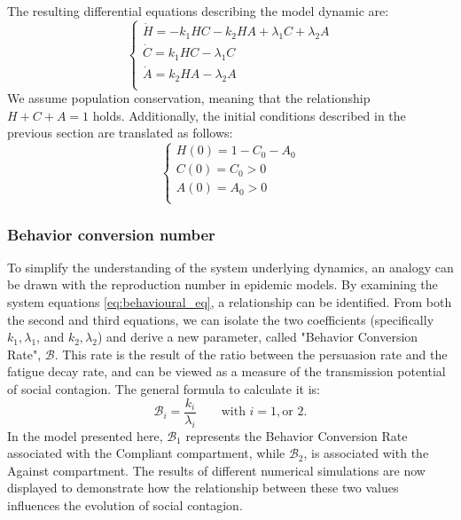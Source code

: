 The resulting differential equations describing the model dynamic are:
\begin{equation}
	\label{eq:behavioural_eq}
	\begin{cases}
		\dot{H} = -k_1 H C - k_2 H A + \lambda_1 C + \lambda_2 A \\
		\dot{C} = k_1 H C -  \lambda_1 C \\
		\dot{A} = k_2 H A -  \lambda_2 A\\
	\end{cases}
\end{equation}
We assume population conservation, meaning that the relationship $H + C + A = 1$ holds. Additionally, the initial conditions described in the previous section are translated as follows:
\begin{equation}
	\begin{cases}
		H(0) = 1 - C_0 - A_0\\
		C(0) = C_0 > 0\\
		A(0) = A_0 > 0\\
	\end{cases}
\end{equation}

\subsubsection{Behavior conversion number}

To simplify the understanding of the system underlying dynamics, an analogy can be drawn with the reproduction number in epidemic models. By examining the system equations \eqref{eq:behavioural_eq}, a relationship can be identified. From both the second and third equations, we can isolate the two coefficients (specifically $k_1 , \lambda_1 $, and  $k_2 , \lambda_2 $)  and derive a new parameter, called "Behavior Conversion Rate", $\mathcal{B}$. This rate is the result of the ratio between the persuasion rate and the fatigue decay rate, and can be viewed as a measure of the transmission potential of social contagion. The general formula to calculate it is:
\begin{equation}
	\mathcal{B}_i =\frac{ k_i }{\lambda_i}  \qquad \text{with } i = 1, \text{or } 2.
	\label{eq:behave_rate}
\end{equation}
In the model presented here, $\mathcal{B}_1$ represents the Behavior Conversion Rate associated with the Compliant compartment, while $\mathcal{B}_2$, is associated with the Against compartment. The results of different numerical simulations are now displayed to demonstrate how the relationship between these two values influences the evolution of social contagion.

